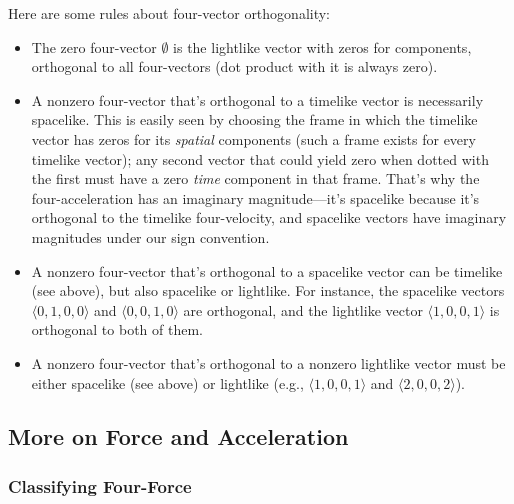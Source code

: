 \documentclass[12pt]{article}
\begin{document}
Here are some rules about four-vector orthogonality:
\begin{itemize}
\item The zero four-vector \mbox{\boldmath $\emptyset$} is the lightlike vector with zeros for components, orthogonal to all four-vectors (dot product with it is always zero).
\item A nonzero four-vector that's orthogonal to a timelike vector is necessarily spacelike. This is easily seen by choosing the frame in which the timelike vector has zeros for its \emph{spatial} components (such a frame exists for every timelike vector); any second vector that could yield zero when dotted with the first must have a zero \emph{time} component in that frame. That's why the four-acceleration has an imaginary magnitude---it's spacelike because it's orthogonal to the timelike four-velocity, and spacelike vectors have imaginary magnitudes under our sign convention.
\item A nonzero four-vector that's orthogonal to a spacelike vector can be timelike (see above), but also spacelike or lightlike. For instance, the spacelike vectors $\langle 0, 1, 0, 0 \rangle$ and $\langle 0, 0, 1, 0 \rangle$ are orthogonal, and the lightlike vector $\langle 1, 0, 0, 1 \rangle$ is orthogonal to both of them.
\item A nonzero four-vector that's orthogonal to a nonzero lightlike vector must be either spacelike (see above) or lightlike (e.g., $\langle 1, 0, 0, 1 \rangle$ and $\langle 2, 0, 0, 2 \rangle$).
\end{itemize}

\subsection{More on Force and Acceleration}\label{ssec:fa2}

\subsubsection{Classifying Four-Force}\label{sssec:cff}
\end{document}
